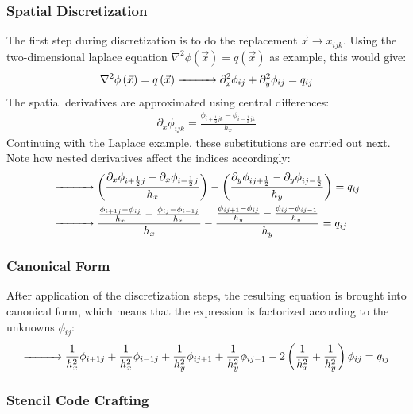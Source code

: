 \subsubsection*{Spatial Discretization}
The first step during discretization is to do the replacement $\vec{x}\rightarrow x_{ijk}$. Using the two-dimensional laplace equation $\nabla^2\phi(\vec{x})=q(\vec{x})$ as example, this would give:
\begin{align*}
\nabla^2\phi\left(\vec{x}\right)=q\left(\vec{x}\right)
\xrightarrow{\makebox[1cm]{}}
\partial_x^2\phi_{ij}+
\partial_y^2\phi_{ij}
=
q_{ij}
\end{align*}
The spatial derivatives are approximated using central differences:
\begin{align}
\partial_x\phi_{ijk} = \frac{\phi_{i+\frac{1}{2}jk} - \phi_{i-\frac{1}{2}jk}}{h_x}
\label{eq:pn_solver_central_difference}
\end{align}
Continuing with the Laplace example, these substitutions are carried out next. Note how nested derivatives affect the indices accordingly:
\begin{align*}
&
\xrightarrow{\makebox[1cm]{}}
\left(
\frac
{
\partial_x
\phi_{i+\frac{1}{2}j}
-
\partial_x
\phi_{i-\frac{1}{2}j}
}
{h_x}
\right)
-
\left(
\frac
{
\partial_y
\phi_{ij+\frac{1}{2}}
-
\partial_y
\phi_{ij-\frac{1}{2}}
}
{h_y}
\right)
=
q_{ij}
\\
&
\xrightarrow{\makebox[1cm]{}}
\frac
{
\frac{\phi_{i+1j} - \phi_{ij}}{h_x}
-
\frac{\phi_{ij} - \phi_{i-1j}}{h_x}
}
{h_x}
-
\frac
{
\frac{\phi_{ij+1} - \phi_{ij}}{h_y}
-
\frac{\phi_{ij} - \phi_{ij-1}}{h_y}
}
{h_y}
=
q_{ij}
\end{align*}

\subsubsection*{Canonical Form}
After application of the discretization steps, the resulting equation is brought into canonical form, which means that the expression is factorized according to the unknowns $\phi_{ij}$:
\begin{align}
\xrightarrow{\makebox[1cm]{}}
\frac{1}{h_x^2}\phi_{i+1j}
+\frac{1}{h_x^2}\phi_{i-1j}
+\frac{1}{h_y^2}\phi_{ij+1}
+\frac{1}{h_y^2}\phi_{ij-1}
-2\left(\frac{1}{h_x^2}+\frac{1}{h_y^2}\right)\phi_{ij}
=
q_{ij}
\label{eq:pn_laplace_canonical_form}
\end{align}

\subsubsection*{Stencil Code Crafting}


